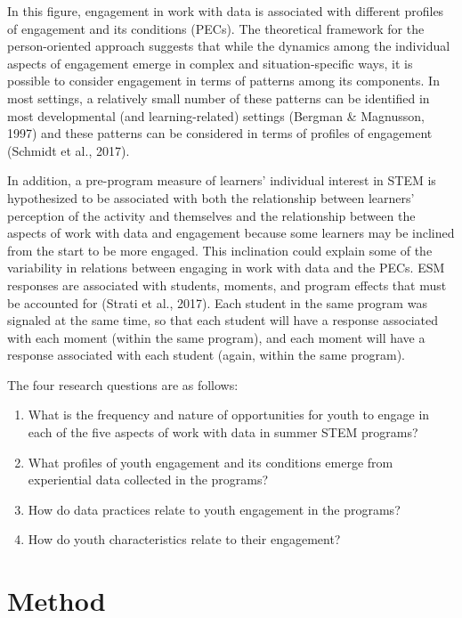 \documentclass[]{msu-thesis}
\providecommand{\tightlist}{%
  \setlength{\itemsep}{0pt}\setlength{\parskip}{0pt}}
\theoremstyle{definition}
\theoremstyle{definition}
\theoremstyle{definition}
\theoremstyle{remark}
\begin{document}
In this figure, engagement in work with data is associated with
different profiles of engagement and its conditions (PECs). The
theoretical framework for the person-oriented approach suggests that
while the dynamics among the individual aspects of engagement emerge in
complex and situation-specific ways, it is possible to consider
engagement in terms of patterns among its components. In most settings,
a relatively small number of these patterns can be identified in most
developmental (and learning-related) settings (Bergman \& Magnusson,
1997) and these patterns can be considered in terms of profiles of
engagement (Schmidt et al., 2017).

In addition, a pre-program measure of learners' individual interest in
STEM is hypothesized to be associated with both the relationship between
learners' perception of the activity and themselves and the relationship
between the aspects of work with data and engagement because some
learners may be inclined from the start to be more engaged. This
inclination could explain some of the variability in relations between
engaging in work with data and the PECs. ESM responses are associated
with students, moments, and program effects that must be accounted for
(Strati et al., 2017). Each student in the same program was signaled at
the same time, so that each student will have a response associated with
each moment (within the same program), and each moment will have a
response associated with each student (again, within the same program).

The four research questions are as follows:

\begin{enumerate}
\def\labelenumi{\arabic{enumi}.}
\tightlist
\item
  What is the frequency and nature of opportunities for youth to engage
  in each of the five aspects of work with data in summer STEM programs?
\item
  What profiles of youth engagement and its conditions emerge from
  experiential data collected in the programs?
\item
  How do data practices relate to youth engagement in the programs?
\item
  How do youth characteristics relate to their engagement?
\end{enumerate}

\chapter{Method}\label{method}
\end{document}
